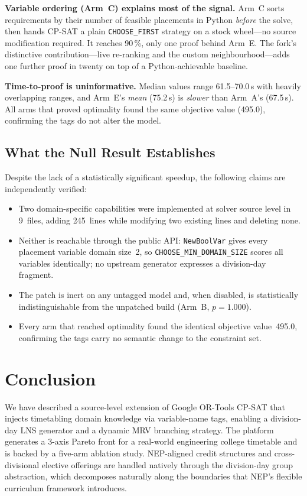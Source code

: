 \documentclass[conference]{IEEEtran}
\begin{document}
\textbf{Variable ordering (Arm~C) explains most of the signal.} Arm~C
sorts requirements by their number of feasible placements in Python
\emph{before} the solve, then hands CP-SAT a plain
\texttt{CHOOSE\_FIRST} strategy on a stock wheel---no source modification
required. It reaches 90\,\%, only one proof behind Arm~E. The fork's
distinctive contribution---live re-ranking and the custom neighbourhood---adds
one further proof in twenty on top of a Python-achievable baseline.

\textbf{Time-to-proof is uninformative.} Median values range 61.5--70.0\,s
with heavily overlapping ranges, and Arm~E's \emph{mean} (75.2\,s) is
\emph{slower} than Arm~A's (67.5\,s). All arms that proved optimality
found the same objective value (495.0), confirming the tags do not alter
the model.

\subsection{What the Null Result Establishes}
Despite the lack of a statistically significant speedup, the following claims
are independently verified:
\begin{itemize}
  \item Two domain-specific capabilities were implemented at solver source
        level in 9~files, adding 245~lines while modifying two existing lines
        and deleting none.
  \item Neither is reachable through the public API: \texttt{NewBoolVar}
        gives every placement variable domain size~2, so
        \texttt{CHOOSE\_MIN\_DOMAIN\_SIZE} scores all variables identically;
        no upstream generator expresses a division-day fragment.
  \item The patch is inert on any untagged model and, when disabled, is
        statistically indistinguishable from the unpatched build (Arm~B,
        $p{=}1.000$).
  \item Every arm that reached optimality found the identical objective
        value~495.0, confirming the tags carry no semantic change to the
        constraint set.
\end{itemize}

\section{Conclusion}\label{sec:conclusion}

We have described a source-level extension of Google OR-Tools CP-SAT that
injects timetabling domain knowledge via variable-name tags, enabling a
division-day LNS generator and a dynamic MRV branching strategy. The
platform generates a 3-axis Pareto front for a real-world engineering college
timetable and is backed by a five-arm ablation study. NEP-aligned credit
structures and cross-divisional elective offerings are handled natively through
the division-day group abstraction, which decomposes naturally along the
boundaries that NEP's flexible curriculum framework introduces.
\end{document}
